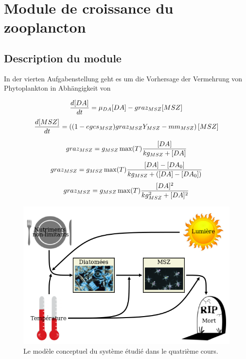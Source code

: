 \section{Module de croissance du zooplancton}

\subsection{Description du module}
\par{
In der vierten Aufgabenstellung geht es um die Vorhersage der Vermehrung von Phytoplankton in Abhängigkeit
von 
}

\begin{equation}
  {{d[DA]}\over{dt}} =
  \mu_{DA} [DA] - graz_{MSZ} [MSZ]
  \label{eq:partie1DiffEq1}
\end{equation}
\begin{equation}
  {{d[MSZ]}\over{dt}} =
  \left (
    (1- eges_{MSZ}) graz_{MSZ} Y_{MSZ} - mm_{MSZ}
  \right ) [MSZ]
  \label{eq:partie1DiffEq2}
\end{equation}

\begin{equation}
  graz_{MSZ} = g_{MSZ} \max(T) {{[DA]}\over{kg_{MSZ}+[DA]}}
  \label{eq:partie1GrazMic}
\end{equation}
\begin{equation}
  graz_{MSZ} = g_{MSZ} \max(T) {{[DA]-[DA_0]}\over{kg_{MSZ}+([DA]-[DA_0])}}
  \label{eq:partie1GrazMicSeul}
\end{equation}
\begin{equation}
  graz_{MSZ} = g_{MSZ} \max(T) {{[DA]^2}\over{kg_{MSZ}^2+[DA]^2}}
  \label{eq:partie1GrazHol}
\end{equation}

\begin{figure}
  \includegraphics[width=\textwidth]{partie1/diagrammeConceptuel.png}
  \caption{Le modèle conceptuel du système étudié dans le quatrième cours.}
  \label{fig:partie1DiagConcept}
\end{figure}



